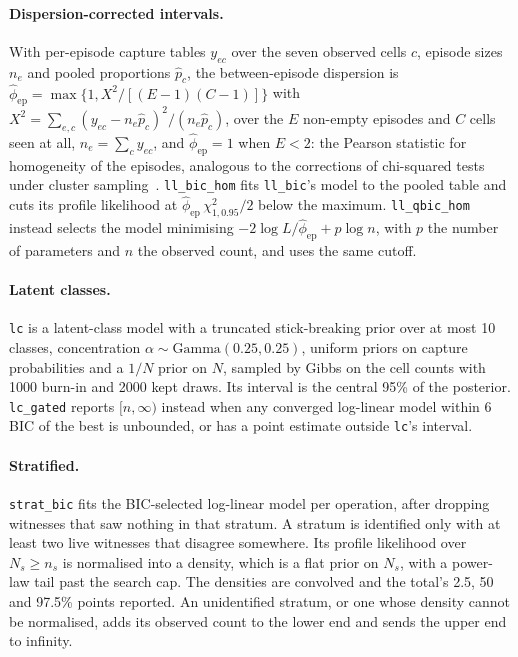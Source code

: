\documentclass[11pt]{article}
\begin{document}
\paragraph{Dispersion-corrected intervals.} With per-episode capture tables
$y_{ec}$ over the seven observed cells $c$, episode sizes $n_e$ and pooled
proportions $\hat p_c$, the between-episode dispersion is
$\hat\phi_{\mathrm{ep}} = \max\{1, X^2/[(E-1)(C-1)]\}$ with
$X^2 = \sum_{e,c} (y_{ec} - n_e\hat p_c)^2 / (n_e \hat p_c)$, over the $E$ non-empty
episodes and $C$ cells seen at all, $n_e = \sum_c y_{ec}$, and $\hat\phi_{\mathrm{ep}}
= 1$ when $E < 2$: the Pearson statistic for homogeneity of the episodes, analogous
to the corrections of chi-squared tests under cluster
sampling~\citep{brier1980cluster,rao1981complex}. \texttt{ll\_bic\_hom} fits
\texttt{ll\_bic}'s model to the pooled table and cuts its profile likelihood at
$\hat\phi_{\mathrm{ep}}\,\chi^2_{1,0.95}/2$ below the maximum.
\texttt{ll\_qbic\_hom} instead selects the model minimising $-2\log L /
\hat\phi_{\mathrm{ep}} + p \log n$, with $p$ the number of parameters and $n$ the
observed count, and uses the same cutoff.

\paragraph{Latent classes.} \texttt{lc} is a latent-class model with a
truncated stick-breaking prior over at most 10 classes, concentration
$\alpha \sim \mathrm{Gamma}(0.25, 0.25)$, uniform priors on capture
probabilities and a $1/N$ prior on $N$, sampled by Gibbs on the cell counts with
1000 burn-in and 2000 kept draws. Its interval is the central 95\% of the
posterior. \texttt{lc\_gated} reports $[n, \infty)$ instead when any converged
log-linear model within 6 BIC of the best is unbounded, or has a point estimate
outside \texttt{lc}'s interval.

\paragraph{Stratified.} \texttt{strat\_bic} fits the BIC-selected log-linear
model per operation, after dropping witnesses that saw nothing in that stratum.
A stratum is identified only with at least two live witnesses that disagree
somewhere. Its profile likelihood over $N_s \ge n_s$ is normalised into a
density, which is a flat prior on $N_s$, with a power-law tail past the search
cap. The densities are convolved and the total's 2.5, 50 and 97.5\% points
reported. An unidentified stratum, or one whose density cannot be normalised,
adds its observed count to the lower end and sends the upper end to infinity.
\end{document}
